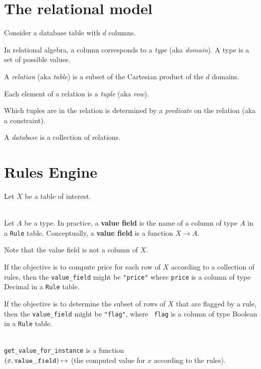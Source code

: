 \documentclass[12pt]{article}
\begin{document}
\section*{The relational model}
Consider a database table with $d$ columns.

In relational algebra, a column corresponds to a \emph{type} (aka \emph{domain}). A type is a set
of possible values.

A \emph{relation} (aka \emph{table}) is a subset of the Cartesian product of the $d$ domains.

Each element of a relation is a \emph{tuple} (aka \emph{row}).

Which tuples are in the relation is determined by a \emph{predicate} on the
relation (aka a constraint).

A \emph{database} is a collection of relations.


\section*{Rules Engine}

Let $X$ be a table of interest.

\begin{definition*}~\\
  Let $A$ be a type. In practice, a \textbf{value field} is the name of a
  column of type $A$ in a {\tt Rule} table. Conceptually, a \textbf{value
    field} is a function $X \to A$.

  Note that the value field is not a column of $X$.
\end{definition*}


\begin{example*}
  If the objective is to compute price for each row of $X$ according to a
  collection of rules, then the {\tt value\_field} might be {\tt "price"} where
  {\tt price} is a column of type Decimal in a {\tt Rule} table.
\end{example*}


\begin{example*}
  If the objective is to determine the subset of rows of $X$ that are flagged
  by a rule, then the {\tt value\_field} might be {\tt "flag"}, where {\tt
    flag} is a column of type Boolean in a {\tt Rule} table.
\end{example*}


\begin{definition*}~\\
  {\tt get\_value\_for\_instance} is a function\\
  $(x, \tt{value\_field}) \mapsto$ (the computed value for $x$ according to the
  rules).
\end{definition*}
\end{document}
